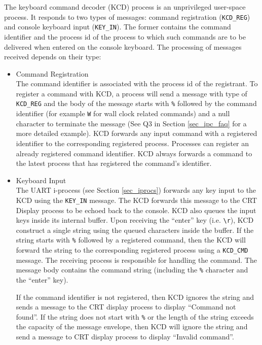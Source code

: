 The keyboard command decoder (KCD) process is an unprivileged user-space process. 
It responds to two types of messages: command registration (\verb+KCD_REG+) and console keyboard input (\verb+KEY_IN+). The former contains the command identifier and the process id of the process to which such commands are to be delivered when entered on the console keyboard. The processing of messages received depends on their type:
\begin{itemize}
\item {Command Registration}\\
The command identifier is associated with the process id of the registrant. To register a command with KCD, a process will send a message with type of \verb+KCD_REG+ and the body of the message starts with \verb+%+ followed by the command identifier (for example \verb+W+ for wall clock related commands) and a null character to terminate the message (See Q3 in Section \ref{sec_ipc_faq} for a more detailed example).
KCD forwards any input command with a registered identifier to the corresponding registered process. Processes can register an already registered command identifier. KCD always forwards a command to the latest process that has registered the command's identifier.

\item {Keyboard Input}\\
  The UART i-process (see Section \ref{sec_iprocs}) forwards any key input to the KCD using the \verb+KEY_IN+ message. The KCD forwards this message to the CRT Display process to be echoed back to the console. KCD also queues the input keys inside its internal buffer. Upon receiving the ``enter'' key (i.e. \verb+\r+), KCD construct a single string using the queued characters inside the buffer. If the string starts with \verb+%+ followed by a registered command, then the KCD will forward the string to the corresponding registered process using a \verb+KCD_CMD+ message. The receiving process is responsible for handling the command. The message body contains the command string (including the \verb+%+ character and the ``enter'' key).

  If the command identifier is not registered, then KCD ignores the string and sends a message to the CRT display process to display ``Command not found''. If the string does not start with \verb+%+ or the length of the string exceeds the capacity of the message envelope, then KCD will ignore the string and send a message to CRT display process to display ``Invalid command''. 
  

\end{itemize}
